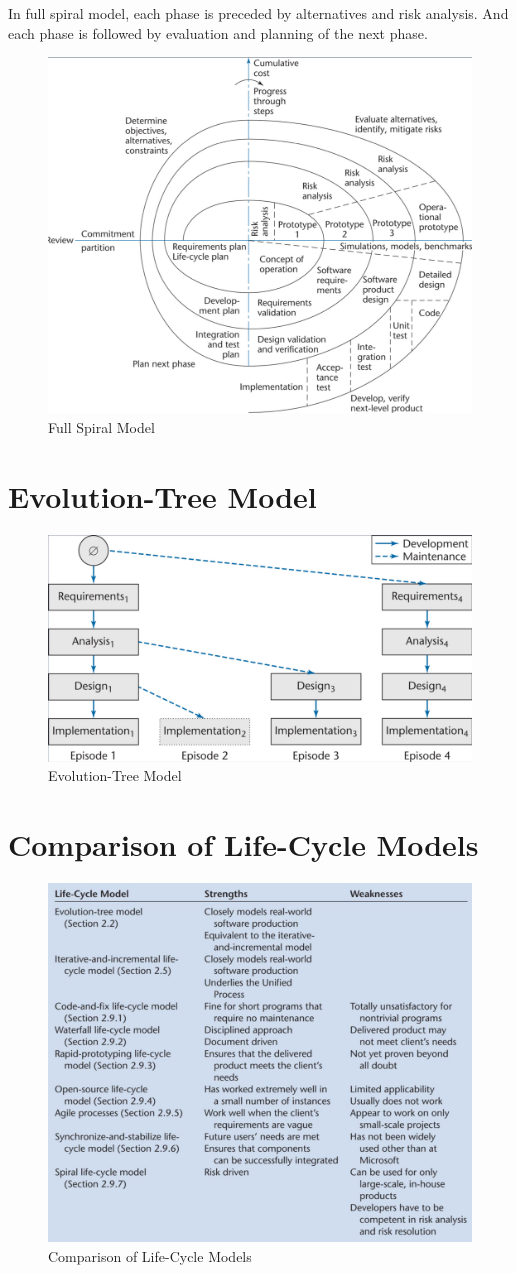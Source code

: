 \documentclass[11pt]{article}
\begin{document}
In full spiral model, each phase is preceded by alternatives and risk analysis. And each phase is followed by evaluation and planning of the next phase.

\begin{figure}[h]
	\centering
	\includegraphics[width=0.6\linewidth]{images/FullSpiral.png}
	\caption{Full Spiral Model}
	\label{fig:FullSpiral}
\end{figure}

\section*{Evolution-Tree Model}
\begin{figure}[h]
	\centering
	\includegraphics[width=0.8\linewidth]{images/EvolutionTree.png}
	\caption{Evolution-Tree Model}
	\label{fig:EvolutionTree}
\end{figure}

\section*{Comparison of Life-Cycle Models}
\begin{figure}[h]
	\centering
	\includegraphics[width=0.9\linewidth]{images/Comparison.png}
	\caption{Comparison of Life-Cycle Models}
	\label{fig:Comparison}
\end{figure}
\end{document}

